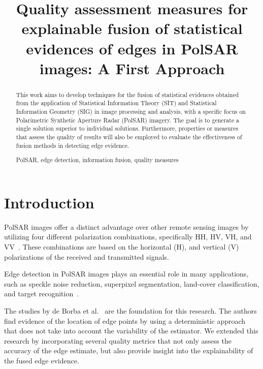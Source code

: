 \documentclass{article}
\title{Quality assessment measures for explainable fusion of statistical evidences of edges in PolSAR images: A First Approach}
\begin{document}
%
\maketitle
%
\begin{abstract}
\vspace{-0.2cm}
This work aims to develop techniques for the fusion of statistical evidences obtained from the application of Statistical Information Theory (SIT) and Statistical Information Geometry (SIG) in image processing and analysis, with a specific focus on Polarimetric Synthetic Aperture Radar (PolSAR) imagery. The goal is to generate a single solution superior to individual solutions. Furthermore, properties or measures that assess the quality of results will also be employed to evaluate the effectiveness of fusion methods in detecting edge evidence.

%
\begin{keywords}
PolSAR, edge detection,  information fusion,  quality
measures 
\end{keywords}
%
\end{abstract}
\vspace{-0.3cm}
\section{Introduction}
\vspace{-0.2cm}
PolSAR images offer a distinct advantage over other remote sensing images by utilizing four different polarization combinations, specifically HH, HV, VH, and VV~\cite{Hua2022}. These combinations are based on the horizontal (H), and vertical (V) polarizations of the received and transmitted signals. 
 
Edge detection in PolSAR images plays an essential role in many applications, such as speckle noise reduction, superpixel segmentation, land-cover classification, and target recognition~\cite{Jin2016}. 


The studies by de Borba et al.~\cite{DeBorba2020,FeatureSelectionforEdgeDetectioninPolSARImages} are the foundation for this research. 
The authors find evidence of the location of edge points by using a deterministic approach that does not take into account the variability of the estimator. 
We extended this research by incorporating several quality metrics that not only assess the accuracy of the edge estimate, but also provide insight into the explainability of the fused edge evidence.
\end{document}

